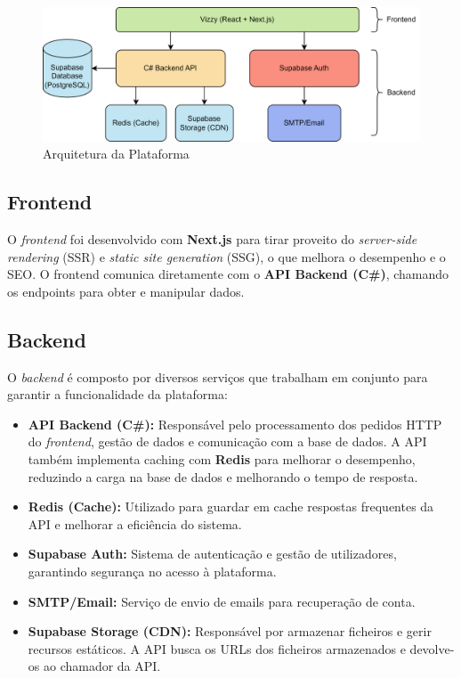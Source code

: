 \documentclass[a4paper, 12pt]{article} %
\begin{document}
\begin{figure}[ht]
	\centering
	\includegraphics[width=\textwidth]{../images/system-architecture.png}
	\caption{Arquitetura da Plataforma}
	\label{fig:arquitetura}
\end{figure}

\subsection{Frontend}
O \textit{frontend} foi desenvolvido com \textbf{Next.js} para tirar proveito do \textit{server-side rendering} (SSR) e \textit{static site generation} (SSG), o que melhora o desempenho e o SEO. O frontend comunica diretamente com o \textbf{API Backend (C\#)}, chamando os endpoints para obter e manipular dados.

\subsection{Backend}
O \textit{backend} é composto por diversos serviços que trabalham em conjunto para garantir a funcionalidade da plataforma:

\begin{itemize}
	\item \textbf{API Backend (C\#):} Responsável pelo processamento dos pedidos HTTP do \textit{frontend}, gestão de dados e comunicação com a base de dados. A API também implementa caching com \textbf{Redis} para melhorar o desempenho, reduzindo a carga na base de dados e melhorando o tempo de resposta.
	\item \textbf{Redis (Cache):} Utilizado para guardar em cache respostas frequentes da API e melhorar a eficiência do sistema.
	\item \textbf{Supabase Auth:} Sistema de autenticação e gestão de utilizadores, garantindo segurança no acesso à plataforma.
	\item \textbf{SMTP/Email:} Serviço de envio de emails para recuperação de conta.
	\item \textbf{Supabase Storage (CDN):} Responsável por armazenar ficheiros e gerir recursos estáticos. A API busca os URLs dos ficheiros armazenados e devolve-os ao chamador da API.
\end{itemize}
\end{document}
